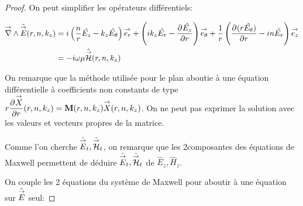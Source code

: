   \begin{proof}

    On peut simplifier les opérateurs différentiels:

    \begin{align}
      \vrot \hat \vE(r,n,k_z) &= i\left(\frac{n}{r}\hat{E_z} - k_z\hat{E_\theta}\right)\vect{e_r} +
      \left(ik_z\hat{E_r} - \ddr{r}{\hat{E_z}}\right)\vect{e_\theta} +
      \frac{1}{r}\left(\ddr{r}{(r\hat{E_\theta})}-in\hat{E_r}\right)\vect{e_z}
      \\
      &=-i\w\mu \hat \vH(r,n,k_z)
    \end{align}

    On remarque que la méthode utilisée pour le plan aboutie à une équation différentielle à coefficients non constants de type \(r\ddr{r}{\vect{X}}(r,n,k_z) = \mat{M}(r,n,k_z)\vect{X}(r,n,k_z)\).
    On ne peut pas exprimer la solution avec les valeurs et vecteurs propres de la matrice.

    Comme l'on cherche \(\hat \vE_t, \hat \vH_t\), on remarque que les 2\ieme composantes des équations de Maxwell permettent de déduire \(\hat\vE_t, \hat\vH_t\) de \( \hat E_z, \hat H_z\).

    On couple les 2 équations du système de Maxwell pour aboutir à une équation sur \(\hat \vE\) seul:




\end{proof}

